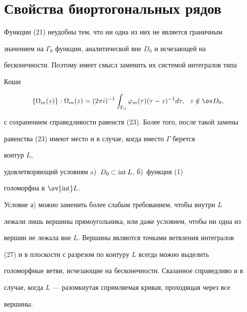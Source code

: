  


 


\section{Свойства биортогональных рядов} 


 


Функции (21) неудобны тем, что ни одна из них не является граничным  


значением на $\Gamma_0$ функции, аналитической вне $D_0$ и исчезающей на 


бесконечности. Поэтому имеет смысл заменить их системой интегралов типа  


Коши 


\begin{equation} 


\{\Omega_m(z)\}:\Omega_m(z)=(2\pi i)^{-1}\int_{\Gamma_0} 


\varphi_m(\tau)(\tau-z)^{-1}d\tau, 


\ \ z\notin\ov D_0, 


\end{equation} 


с сохранением справедливости равенств (23). Более того, после такой замены  


равенства (23) имеют место и в случае, когда вместо $\Gamma$ берется 


контур $L$, 


удовлетворяющий условиям a)~$D_0\subset\operatorname{int} L$, б)~функция (1) 


голоморфна в $\ov{\Int}L$. 


 


Условие а) можно заменить более слабым требованием, чтобы внутри $L$  


лежали лишь вершины прямоугольника, или даже условием, чтобы ни одна из  


вершин не лежала вне $L$. Вершины являются точками ветвления интегралов  


(27) и в плоскости с разрезом по контуру $L$ всегда можно выделить  


голоморфные ветви, исчезающие на бесконечности. Сказанное справедливо и в  


случае, когда $L$ --- разомкнутая спрямляемая кривая, проходящая через все  


вершины.  


 


